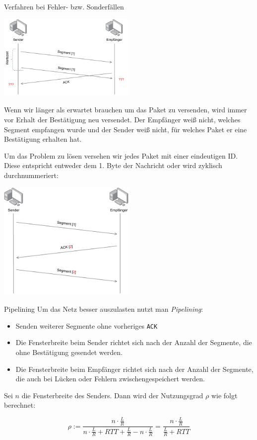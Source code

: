 \begin{bonus}{Verfahren bei Fehler- bzw. Sonderfällen}
    \begin{center}
        \includegraphics[width=0.5\textwidth]{includes/figures/bonus_arq_error.pdf}
    \end{center}

    Wenn wir länger als erwartet brauchen um das Paket zu versenden, wird immer vor Erhalt der Bestätigung neu versendet.
    Der Empfänger weiß nicht, welches Segment empfangen wurde und der Sender weiß nicht, für welches Paket er eine Bestätigung erhalten hat.

    Um das Problem zu lösen versehen wir jedes Paket mit einer eindeutigen ID.
    Diese entspricht entweder dem 1. Byte der Nachricht oder wird zyklisch durchnummeriert:

    \begin{center}
        \includegraphics[width=0.5\textwidth]{includes/figures/bonus_arq.pdf}
    \end{center}
\end{bonus}

\begin{defi}{Pipelining}
    Um das Netz besser auszulasten nutzt man \emph{Pipelining}:
    \begin{itemize}
        \item Senden weiterer Segmente ohne vorheriges \texttt{ACK}
        \item Die Fensterbreite beim Sender richtet sich nach der Anzahl der Segmente, die ohne Bestätigung gesendet werden.
        \item Die Fensterbreite beim Empfänger richtet sich nach der Anzahl der Segmente, die auch bei Lücken oder Fehlern zwischengespeichert werden.
    \end{itemize}

    Sei $n$ die Fensterbreite des Senders.
    Dann wird der Nutzungsgrad $\rho$ wie folgt berechnet:

    \[
        \rho := \frac{n \cdot \frac{L}{R}}{n \cdot \frac{L}{R} + RTT + \frac{L}{R} - n \cdot \frac{L}{R}} = \frac{n \cdot \frac{L}{R}}{\frac{L}{R} + RTT}
    \]
\end{defi}

